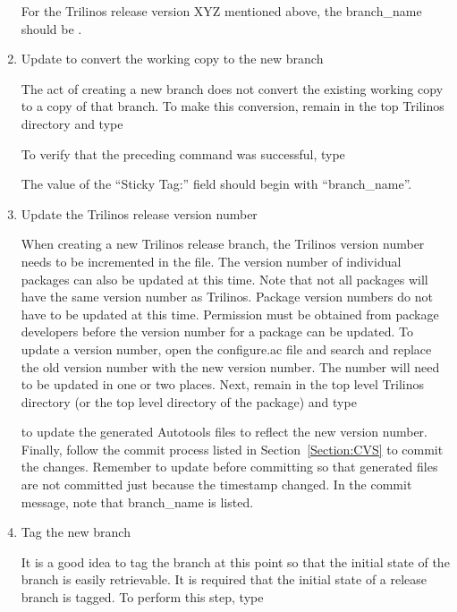 \documentclass[12pt,relax]{TrilinosDevGuide}
\begin{document}
\begin{enumerate}

For the Trilinos release version XYZ mentioned above, the branch\_name 
should be .

\item Update to convert the working copy to the new branch

The act of creating a new branch does not convert the existing working copy to 
a copy of that branch.  To make this conversion, remain in the top Trilinos 
directory and type


To verify that the preceding command was successful, type 


The value of the ``Sticky Tag:'' field should begin with ``branch\_name''.

\item Update the Trilinos release version number

When creating a new Trilinos release branch, the Trilinos version number needs 
to be incremented in the  file.  The 
version number of individual packages can also be updated at this time.  Note 
that not all packages will have the same version number as Trilinos.  Package 
version numbers do not have to be updated at this time.  Permission must be 
obtained from package developers before the version number for a package can 
be updated.  To update a version number, open the configure.ac file and 
search and replace the old version number with the new 
version number.  The number will need to be updated in one or two places.  
Next, remain in the top level Trilinos directory (or the top level directory 
of the package) and type


to update the generated Autotools files to reflect the new version number.  
Finally, follow the commit process listed in Section~\ref{Section:CVS} to 
commit the changes.  Remember to update before committing so that generated 
files are not committed just because the timestamp changed.  In the commit 
message, note that branch\_name is listed.

\item Tag the new branch

It is a good idea to tag the branch at this point so that the initial state 
of the branch is easily retrievable.  It is required that the initial state of 
a release branch is tagged.  To perform this step, type


\end{enumerate}
\end{document}
